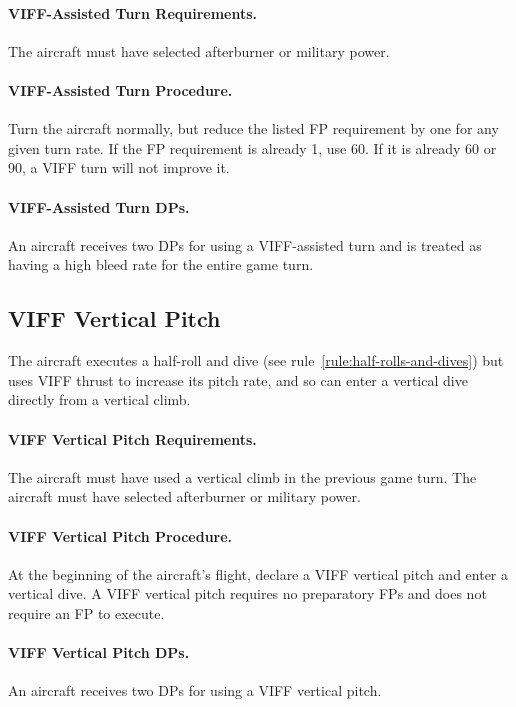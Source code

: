 \begin{advancedrules}
{\paragraph{VIFF-Assisted Turn Requirements.} The aircraft must have selected afterburner or military power.

\paragraph{VIFF-Assisted Turn Procedure.} Turn the aircraft normally, but reduce the listed FP requirement by one for any given turn rate. If the FP requirement is already 1, use 60{\deg}. If it is already 60{\deg} or 90{\deg}, a VIFF turn will not improve it.

\paragraph{VIFF-Assisted Turn DPs.} An aircraft receives two DPs for using a VIFF-assisted turn and is treated as having a high bleed rate for the entire game turn.

\subsection{VIFF Vertical Pitch}
\label{rule:viff-vertical-pitch}

The aircraft executes a half-roll and dive (see rule~\ref{rule:half-rolls-and-dives}) but uses VIFF thrust to increase its pitch rate, and so can enter a vertical dive directly from a vertical climb.

\paragraph{VIFF Vertical Pitch Requirements.} The aircraft must have used a vertical climb in the previous game turn. The aircraft must have selected afterburner or military power.

\paragraph{VIFF Vertical Pitch Procedure.} At the beginning of the aircraft's flight, declare a VIFF vertical pitch and enter a vertical dive. A VIFF vertical pitch requires no preparatory FPs and does not require an FP to execute.

\paragraph{VIFF Vertical Pitch DPs.} An aircraft receives two DPs for using a VIFF vertical pitch.

}
\end{advancedrules}
